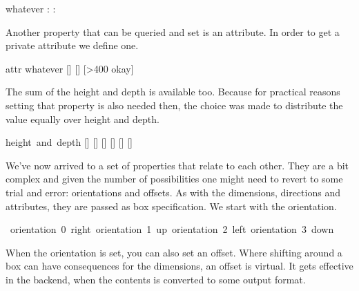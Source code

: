 \startbuffer
\setbox\scratchbox\hbox{whatever}
\the\boxdirection\scratchbox: \copy\scratchbox \crlf
\boxdirection{}
\the\boxdirection\scratchbox: \copy\scratchbox
\stopbuffer

\typebuffer[option=TEX]

\startlinecorrection
\getbuffer
\stoplinecorrection

Another property that can be queried and set is an attribute. In order to get
a private attribute we define one.

\startbuffer
\newattribute\MyAt
\setbox\scratchbox\hbox attr  {whatever}
[\the\boxattribute\scratchbox\MyAt]
\boxattribute\scratchbox{}
[\the\boxattribute\scratchbox\MyAt]
[\ifnum\boxattribute\scratchbox\MyAt>400 okay\fi]
\stopbuffer

\typebuffer[option=TEX]

\startlinecorrection
\getbuffer
\stoplinecorrection

The sum of the height and depth is available too. Because for practical reasons
setting that property is also needed then, the choice was made to distribute the
value equally over height and depth.

\startbuffer
\setbox\scratchbox\hbox {height and depth}
[\the\ht\scratchbox]
[\the\dp\scratchbox]
[\the\boxtotal\scratchbox]
\boxtotal\scratchbox=20pt
[\the\ht\scratchbox]
[\the\dp\scratchbox]
[\the\boxtotal\scratchbox]
\stopbuffer

\typebuffer[option=TEX]

\startlinecorrection
\getbuffer
\stoplinecorrection

We've now arrived to a set of properties that relate to each other. They are
a bit complex and given the number of possibilities one might need to revert
to some trial and error: orientations and offsets. As with the dimensions,
directions and attributes, they are passed as box specification. We start
with the orientation.

\startbuffer
\hbox \bgroup \showboxes
          \hbox orientation 0 {right}
    \quad \hbox orientation 1 {up}
    \quad \hbox orientation 2 {left}
    \quad \hbox orientation 3 {down}
\egroup
\stopbuffer

\typebuffer[option=TEX]

\startlinecorrection
\getbuffer
\stoplinecorrection

When the orientation is set, you can also set an offset. Where shifting around a box
can have consequences for the dimensions, an offset is virtual. It gets effective
in the backend, when the contents is converted to some output format.

